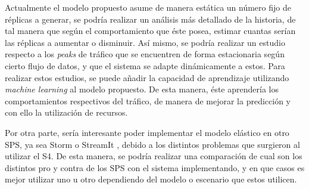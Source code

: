 
Actualmente el modelo propuesto asume de manera est\'atica un n\'umero fijo de r\'eplicas a generar, se podr\'ia realizar un an\'alisis m\'as detallado de la historia, de tal manera que seg\'un el comportamiento que \'este posea, estimar cuantas ser\'ian las r\'eplicas a aumentar o disminuir. As\'i mismo, se podr\'ia realizar un estudio respecto a los \textit{peaks} de tr\'afico que se encuentren de forma estacionaria seg\'un cierto flujo de datos, y que el sistema se adapte din\'amicamente a estos. Para realizar estos estudios, se puede a\~nadir la capacidad de aprendizaje utilizando \textit{machine learning} \citep{bookMohri2012} al modelo propuesto. De esta manera, \'este aprender\'ia los comportamientos respectivos del tr\'afico, de manera de mejorar la predicci\'on y con ello la utilizaci\'on de recursos.


Por otra parte, ser\'ia interesante poder implementar el modelo el\'astico en otro SPS, ya sea Storm \citep{stormtwitter} o StreamIt \citep{ThiesKA02}, debido a los distintos problemas que surgieron al utilizar el S4. De esta manera, se podr\'ia realizar una comparaci\'on de cual son los distintos pro y contra de los SPS con el sistema implementando, y en que casos es mejor utilizar uno u otro dependiendo del modelo o escenario que estos utilicen.